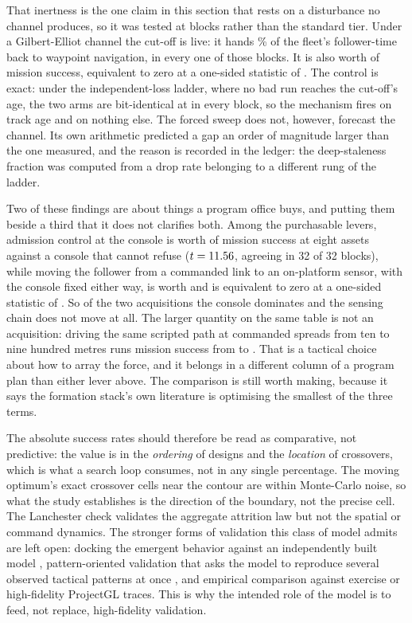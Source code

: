 \documentclass[11pt]{article}
\begin{document}
That inertness is the one claim in this section that rests on a disturbance no channel produces, so
it was tested at \FoBrBlocks{} blocks rather than the standard tier. Under a Gilbert-Elliot channel
the cut-off is live: it hands \FoBrLost\% of the fleet's follower-time back to waypoint navigation,
in every one of those blocks. It is also worth \FoBrGap{} of mission success, equivalent to zero at
a one-sided statistic of \FoBrTost{}. The control is exact: under the independent-loss ladder, where
no bad run reaches the cut-off's age, the two arms are bit-identical at \FoBrCtrl{} in every block,
so the mechanism fires on track age and on nothing else. The forced sweep does not, however, forecast
the channel. Its own arithmetic predicted a gap an order of magnitude larger than the one measured,
and the reason is recorded in the ledger: the deep-staleness fraction
was computed from a drop rate belonging to a different rung of the ladder.

Two of these findings are about things a program office buys, and putting them beside a third that it
does not clarifies both. Among the purchasable levers, admission control at the console is worth
\FoConsoleLever{} of mission success at eight assets against a console that cannot refuse
($t = 11.56{}$, agreeing in 32 of 32 blocks), while moving the follower from a commanded link
to an on-platform sensor, with the console fixed either way, is worth \FoPlatformLever{} and is
equivalent to zero at a one-sided statistic of \FoPlatformTost{}. So of the two acquisitions the
console dominates and the sensing chain does not move at all. The larger quantity on the same table
is not an acquisition: driving the same scripted path at commanded spreads from ten to nine hundred
metres runs mission success from \FoSpreadTight{} to \FoSpreadWide{}. That is a tactical choice
about how to array the force, and it belongs in a different column of a program plan than either
lever above. The comparison is still worth making, because it says the formation stack's own
literature is optimising the smallest of the three terms.

The absolute success rates should therefore be read as comparative, not predictive: the value is in the \emph{ordering} of designs and the \emph{location} of crossovers, which is what a search loop consumes, not in any single percentage. The moving optimum's exact crossover cells near the contour are within Monte-Carlo noise, so what the study establishes is the direction of the boundary, not the precise cell. The Lanchester check validates the aggregate attrition law but not the spatial or command dynamics. The stronger forms of validation this class of model admits are left open: docking the emergent behavior against an independently built model \citep{axtell1996aligning}, pattern-oriented validation that asks the model to reproduce several observed tactical patterns at once \citep{grimm2005pattern}, and empirical comparison against exercise or high-fidelity ProjectGL traces. This is why the intended role of the model is to feed, not replace, high-fidelity validation.
\end{document}
